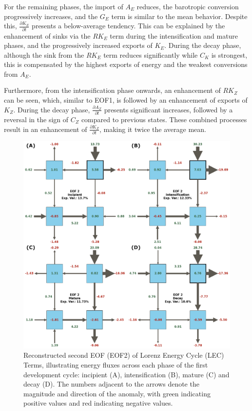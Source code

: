For the remaining phases, the import of $A_E$ reduces, the barotropic conversion progressively increases, and the $G_E$ term is similar to the mean behavior. Despite this, $\frac{\partial K_E}{\partial t}$ presents a below-average tendency. This can be explained by the enhancement of sinks via the $RK_E$ term during the intensification and mature phases, and the progressively increased exports of $K_E$. During the decay phase, although the sink from the $RK_E$ term reduces significantly while $C_K$ is strongest, this is compensated by the highest exports of energy and the weakest conversions from $A_E$.

Furthermore, from the intensification phase onwards, an enhancement of $RK_Z$ can be seen, which, similar to EOF1, is followed by an enhancement of exports of $K_Z$. During the decay phase, $\frac{\partial A_Z}{\partial t}$ presents significant increases, followed by a reversal in the sign of $C_Z$ compared to previous states. These combined processes result in an enhancement of $\frac{\partial K_Z}{\partial t}$, making it twice the average mean.


\begin{figure}[!htbp]
\centering
\includegraphics[width=\textwidth]{figs_5/eof2_phases_reconstructed.pdf}
\caption[Reconstructed EOF2 - Phases]{Reconstructed second EOF (EOF2) of Lorenz Energy Cycle (LEC) Terms, illustrating energy fluxes across each phase of the first development cycle: incipient (A), intensification (B), mature (C) and decay (D).  The numbers adjacent to the arrows denote the magnitude and direction of the anomaly, with green indicating positive values and red indicating negative values.}
\label{fig:eof2_phases}
\end{figure}


